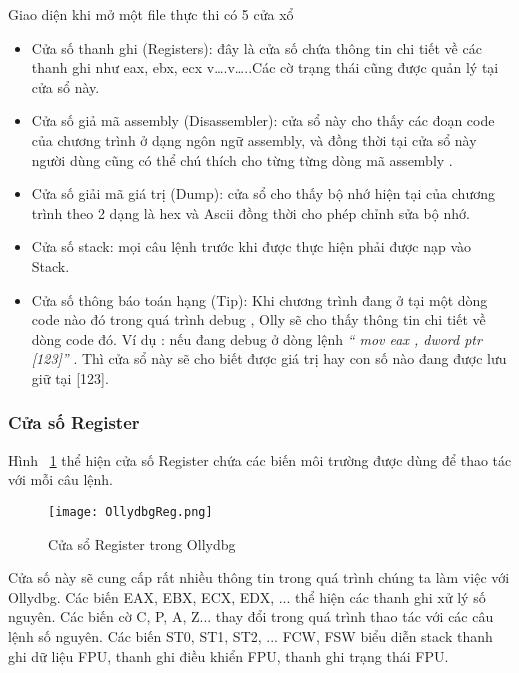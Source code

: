Giao diện khi mở một file thực thi có 5 cửa xổ
	
	\begin{itemize}
		\item[1] Cửa số thanh ghi (Registers): đây là cửa số chứa thông tin chi tiết về các thanh ghi như eax, ebx, ecx v….v…..Các cờ trạng thái cũng được quản lý tại cửa sổ này.
		\item[2] Cửa số giả mã assembly (Disassembler): cửa sổ này cho thấy các đoạn code của chương trình ở dạng ngôn ngữ assembly, và đồng thời tại cửa sổ này người dùng cũng có thể chú thích cho từng từng dòng mã assembly .
		\item[3] Cửa số giải mã giá trị (Dump): cửa sổ cho thấy bộ nhớ hiện tại của chương trình theo 2 dạng là hex và Ascii đồng thời cho phép chỉnh sửa bộ nhớ.
		\item[4] Cửa số stack:  mọi câu lệnh trước khi được thực hiện phải được nạp vào Stack.
		\item[5] Cửa số thông báo toán hạng (Tip):  Khi chương trình đang ở tại một dòng code nào đó trong quá trình debug ,  Olly sẽ cho thấy thông tin chi tiết về dòng code đó. Ví dụ  : nếu đang debug ở dòng lệnh \textit{ “ mov eax , dword ptr [123]”} . Thì cửa sổ này sẽ cho biết được giá trị hay con số nào đang được lưu giữ tại [123].
		\end{itemize}
	
	\subsubsection*{Cửa số Register}	
	Hình ~\ref{fig:OllydbgReg} thể hiện cửa số Register chứa các biến môi trường được dùng để thao tác với  mỗi câu lệnh.
	\begin{center}
			\begin{figure}[htp]
				\begin{center}
					\texttt{[image: OllydbgReg.png]}
				\end{center}
				\caption{Cửa sổ Register trong Ollydbg}	
					\label{fig:OllydbgReg}		
			\end{figure}
		\end{center}		
		
		Cửa số này sẽ cung cấp rất nhiều thông tin trong quá trình chúng ta làm việc với Ollydbg. Các biến EAX, EBX, ECX, EDX, ... thể hiện các thanh ghi xử lý số nguyên. Các biến cờ C, P, A, Z... thay đổi trong quá trình thao tác với các câu lệnh số nguyên. Các biến ST0, ST1, ST2, ... FCW, FSW biểu diễn stack thanh ghi dữ liệu FPU, thanh ghi điều khiển FPU, thanh ghi trạng thái FPU.
		
